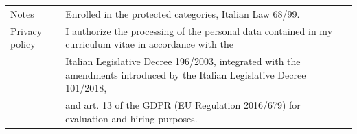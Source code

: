 \documentclass[]{style}
\begin{document}
\makecvfooter
{{\def\arraystretch{1.15}{\begin{tabular}{ l l }
		Notes  & { Enrolled in the protected categories, Italian Law 68/99. } \\
		Privacy policy  & { I authorize the processing of the personal data contained in my curriculum vitae in accordance with the } \\
		& { Italian Legislative Decree 196/2003, integrated with the amendments introduced by the Italian Legislative Decree 101/2018, } \\
		& { and art. 13 of the GDPR (EU Regulation 2016/679) for evaluation and hiring purposes. } \\
		\end{tabular}}}}
{}
{}

\
\end{document}
